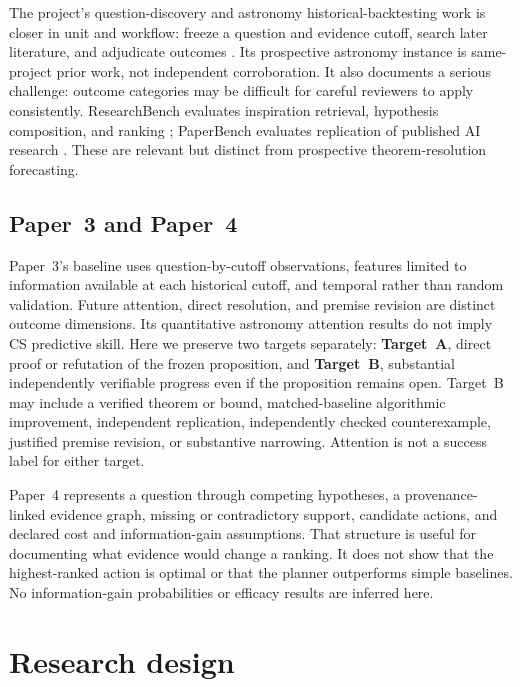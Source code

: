 \documentclass[11pt]{article}
\begin{document}
The project's question-discovery and astronomy historical-backtesting work is closer in unit and workflow: freeze a question and evidence cutoff, search later literature, and adjudicate outcomes \citep{mao2026questiondiscovery,mao2026backtesting}. Its prospective astronomy instance is same-project prior work, not independent corroboration. It also documents a serious challenge: outcome categories may be difficult for careful reviewers to apply consistently. ResearchBench evaluates inspiration retrieval, hypothesis composition, and ranking \citep{liu2026researchbench}; PaperBench evaluates replication of published AI research \citep{starace2025paperbench}. These are relevant but distinct from prospective theorem-resolution forecasting.

\subsection{Paper~3 and Paper~4}
Paper~3's baseline uses question-by-cutoff observations, features limited to information available at each historical cutoff, and temporal rather than random validation. Future attention, direct resolution, and premise revision are distinct outcome dimensions. Its quantitative astronomy attention results do not imply CS predictive skill. Here we preserve two targets separately: \textbf{Target~A}, direct proof or refutation of the frozen proposition, and \textbf{Target~B}, substantial independently verifiable progress even if the proposition remains open. Target~B may include a verified theorem or bound, matched-baseline algorithmic improvement, independent replication, independently checked counterexample, justified premise revision, or substantive narrowing. Attention is not a success label for either target.

Paper~4 represents a question through competing hypotheses, a provenance-linked evidence graph, missing or contradictory support, candidate actions, and declared cost and information-gain assumptions. That structure is useful for documenting what evidence would change a ranking. It does not show that the highest-ranked action is optimal or that the planner outperforms simple baselines. No information-gain probabilities or efficacy results are inferred here.

\section{Research design}
\end{document}
